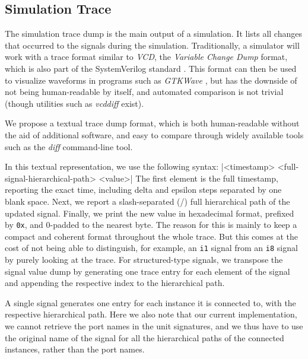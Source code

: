 



\subsection{Simulation Trace}
\label{sec:trace}
The simulation trace dump is the main output of a simulation. It lists all changes that occurred to the signals during the simulation. Traditionally, a simulator will work with a trace format similar to \textit{VCD}, the \textit{Variable Change Dump} format, which is also part of the SystemVerilog standard \cite{SV2018}. This format can then be used to visualize waveforms in programs such as \textit{GTKWave} \cite{gtkwave}, but has the downside of not being human-readable by itself, and automated comparison is not trivial (though utilities such as \textit{vcddiff} \cite{vcddiff} exist).

We propose a textual trace dump format, which is both human-readable without the aid of additional software, and easy to compare through widely available tools such as the \textit{diff} command-line tool.


In this textual representation, we use the following syntax:
|<timestamp>  <full-signal-hierarchical-path>  <value>|
\noindent The first element is the full timestamp, reporting the exact time, including delta and epsilon steps separated by one blank space. Next, we report a slash-separated (/) full hierarchical path of the updated signal. Finally, we print the new value in hexadecimal format, prefixed by \texttt{0x}, and $0$-padded to the nearest byte. The reason for this is mainly to keep a compact and coherent format throughout the whole trace. But this comes at the cost of not being able to distinguish, for example, an \texttt{i1} signal from an \texttt{i8} signal by purely looking at the trace.
For structured-type signals, we transpose the signal value dump by generating one trace entry for each element of the signal and appending the respective index to the hierarchical path.

A single signal generates one entry for each instance it is connected to, with the respective hierarchical path. Here we also note that our current implementation, we cannot retrieve the port names in the unit signatures, and we thus have to use the original name of the signal for all the hierarchical paths of the connected instances, rather than the port names.

